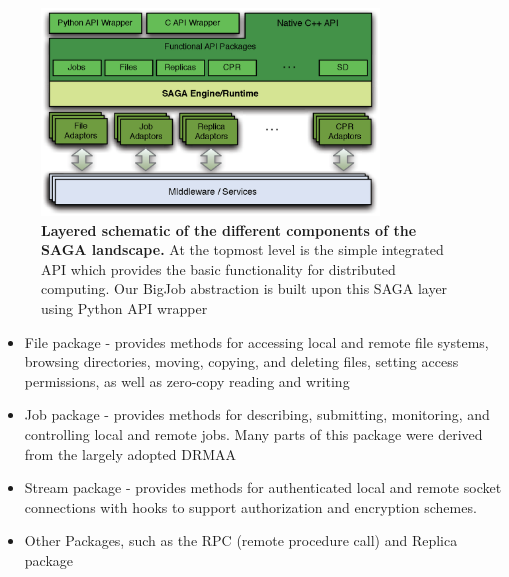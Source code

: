 \documentclass[preprint,12pt]{elsarticle}
\newcommand{\skonote}[1]{ {\textcolor{green} { ***Jeff: #1 }}}
\newcommand{\skonote}[1]{}
\begin{document}
\begin{figure}
 \begin{center}
     \includegraphics[width=0.8\textwidth]{Structure_of_SAGA.eps}
 \end{center}
\caption{\small {\bf Layered schematic of the different components of the SAGA landscape.} At the topmost level is the simple integrated API which provides the basic functionality for distributed computing. Our BigJob abstraction is built upon this SAGA layer using Python API wrapper}
 \label{Fig:SAGA1}
 \vspace{-1em}
\end{figure}

\begin{itemize}
\item File package - provides methods for accessing local and remote file systems, browsing directories, moving, copying, and deleting files, setting access permissions, as well as zero-copy reading and writing
\item Job package - provides methods for describing, submitting, monitoring, and controlling local and remote jobs. Many parts of this package were derived from the largely adopted DRMAA %
\item Stream package - provides methods for authenticated local and remote socket connections with hooks to support authorization and encryption schemes.
\item Other Packages, such as the RPC (remote procedure call) and Replica package
\end{itemize}


\end{document}
